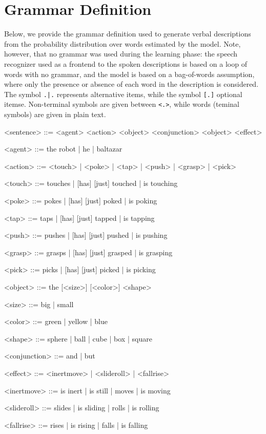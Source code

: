 \section{Grammar Definition}
\label{appendix:grammar}
Below, we provide the grammar definition used to generate verbal descriptions from the probability distribution over words estimated by the model.
Note, however, that no grammar was used during the learning phase: the speech recognizer used as a frontend to the spoken descriptions is based on a loop of words with no grammar, and the \AffWords{} model is based on a bag-of-words assumption, where only the presence or absence of each word in the description is considered.
The symbol \texttt{.|.} represents alternative items, while the symbol \texttt{[.]} optional itemse.
Non-terminal symbols are given between \texttt{<.>}, while words (teminal symbols) are given in plain text.


\begin{grammar}
  <sentence> ::= <agent> <action> <object> <conjunction> <object> <effect>

  <agent> ::= the robot | he | baltazar 

  <action> ::= <touch> | <poke> | <tap> | <push> | <grasp> | <pick>

  <touch> ::= touches | [has] [just] touched | is touching

  <poke> ::= pokes | [has] [just] poked | is poking

  <tap> ::= taps | [has] [just] tapped | is tapping

  <push> ::= pushes | [has] [just] pushed | is pushing

  <grasp> ::= grasps | [has] [just] grasped | is grasping

  <pick> ::= picks | [has] [just] picked | is picking

  <object> ::= the [<size>] [<color>] <shape>

  <size> ::= big | small
  
  <color> ::= green | yellow | blue
  
  <shape> ::= sphere | ball | cube | box | square

  <conjunction> ::= and | but

  <effect> ::= <inertmove> | <slideroll> | <fallrise>

  <inertmove> ::= is inert | is still | moves | is moving

  <slideroll> ::= slides | is sliding | rolls | is rolling

  <fallrise> ::= rises | is rising | falls | is falling
\end{grammar}

